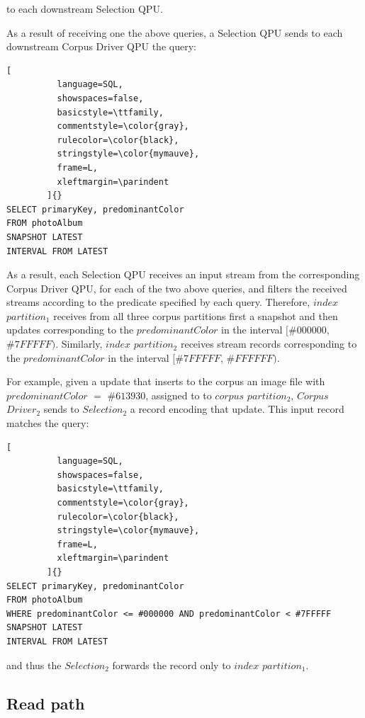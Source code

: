 \noindent
to each downstream Selection QPU.

\noindent
As a result of receiving one the above queries,
a Selection QPU sends to each downstream Corpus Driver QPU the query:

\begin{lstlisting}[
          language=SQL,
          showspaces=false,
          basicstyle=\ttfamily,
          commentstyle=\color{gray},
          rulecolor=\color{black},
          stringstyle=\color{mymauve},
          frame=L,
          xleftmargin=\parindent
        ]{}
SELECT primaryKey, predominantColor
FROM photoAlbum
SNAPSHOT LATEST
INTERVAL FROM LATEST
\end{lstlisting}

As a result, each Selection QPU receives an input stream from the corresponding Corpus Driver QPU,
for each of the two above queries,
and filters the received streams according to the predicate specified by each query.
Therefore, $index$ $partition_1$ receives from all three corpus partitions first a snapshot and then updates
corresponding to the $predominantColor$ in the interval $[\#000000$, $\#7FFFFF)$.
Similarly, $index$ $partition_2$ receives stream records corresponding to the $predominantColor$ in the interval
$[\#7FFFFF$, $\#FFFFFF)$.

For example, given a update that inserts to the corpus an image file with $predominantColor$ $=$ $\#613930$, assigned to to $corpus$
$partition_2$, $Corpus$ $Driver_2$ sends to $Selection_2$ a record encoding that update.
This input record matches the query:

\begin{lstlisting}[
          language=SQL,
          showspaces=false,
          basicstyle=\ttfamily,
          commentstyle=\color{gray},
          rulecolor=\color{black},
          stringstyle=\color{mymauve},
          frame=L,
          xleftmargin=\parindent
        ]{}
SELECT primaryKey, predominantColor
FROM photoAlbum
WHERE predominantColor <= #000000 AND predominantColor < #7FFFFF
SNAPSHOT LATEST
INTERVAL FROM LATEST
\end{lstlisting}

and thus the $Selection_2$  forwards the record only to $index$ $partition_1$.

\subsection{Read path}
\label{sec:cs_index_partitioning_read_path}

